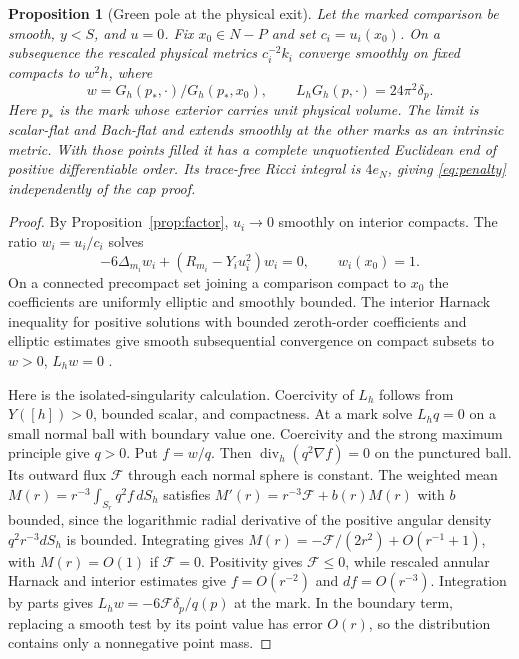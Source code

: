 \documentclass[11pt]{article}
\newtheorem{proposition}[theorem]{Proposition}
\theoremstyle{definition}
\theoremstyle{remark}
\begin{document}
\begin{proposition}[Green pole at the physical exit]\label{prop:green}
Let the marked comparison be smooth, \(y<S\), and \(u=0\). Fix \(x_0\in N-P\) and set \(c_i=u_i(x_0)\). On a subsequence the rescaled physical metrics \(c_i^{-2}k_i\) converge smoothly on fixed compacts to \(w^2h\), where
\[
 w=G_h(p_*,\cdot)/G_h(p_*,x_0),\qquad L_hG_h(p,\cdot)=24\pi^2\delta_p .
\]
Here \(p_*\) is the mark whose exterior carries unit physical volume. The limit is scalar-flat and Bach-flat and extends smoothly at the other marks as an intrinsic metric. With those points filled it has a complete unquotiented Euclidean end of positive differentiable order. Its trace-free Ricci integral is \(4e_N\), giving \eqref{eq:penalty} independently of the cap proof.
\end{proposition}
\begin{proof}
By Proposition~\ref{prop:factor}, \(u_i\to0\) smoothly on interior compacts. The ratio \(w_i=u_i/c_i\) solves
\[
 -6\Delta_{m_i}w_i+(R_{m_i}-Y_i u_i^2)w_i=0,\qquad w_i(x_0)=1.
\]
On a connected precompact set joining a comparison compact to \(x_0\) the coefficients are uniformly elliptic and smoothly bounded. The interior Harnack inequality for positive solutions with bounded zeroth-order coefficients and elliptic estimates give smooth subsequential convergence on compact subsets to \(w>0\), \(L_hw=0\) \cite[Theorem 8.20]{GilbargTrudinger2001Elliptic}.

Here is the isolated-singularity calculation. Coercivity of \(L_h\) follows from \(Y([h])>0\), bounded scalar, and compactness. At a mark solve \(L_h q=0\) on a small normal ball with boundary value one. Coercivity and the strong maximum principle give \(q>0\). Put \(f=w/q\). Then \(\operatorname{div}_h(q^2\nabla f)=0\) on the punctured ball. Its outward flux \(\mathcal F\) through each normal sphere is constant. The weighted mean \(M(r)=r^{-3}\int_{S_r}q^2f\,dS_h\) satisfies \(M'(r)=r^{-3}\mathcal F+b(r)M(r)\) with \(b\) bounded, since the logarithmic radial derivative of the positive angular density \(q^2r^{-3}dS_h\) is bounded. Integrating gives \(M(r)=-\mathcal F/(2r^2)+O(r^{-1}+1)\), with \(M(r)=O(1)\) if \(\mathcal F=0\). Positivity gives \(\mathcal F\le0\), while rescaled annular Harnack and interior estimates give \(f=O(r^{-2})\) and \(df=O(r^{-3})\). Integration by parts gives \(L_hw=-6\mathcal F\delta_p/q(p)\) at the mark. In the boundary term, replacing a smooth test by its point value has error \(O(r)\), so the distribution contains only a nonnegative point mass.


\end{proof}
\end{document}
